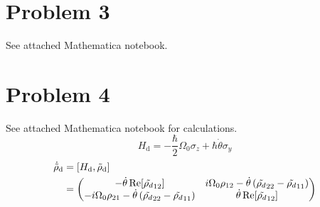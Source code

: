\documentclass[12pt]{article}
\begin{document}
\section*{Problem 3}
See attached Mathematica notebook.

\section*{Problem 4}
See attached Mathematica notebook for calculations.
\[ H_\text{d} = -\frac{\hbar}{2}\Omega_0\sigma_z + \hbar\dot{\theta}\sigma_y \]
\begin{align*}
    \dot{\tilde{\rho}}_\text{d} &= \comm{H_\text{d}}{\tilde{\rho}_\text{d}} \\
    &= \mqty(-\dot{\theta}\Re[\tilde{\rho_d}_{12}] & i\Omega_0\rho_{12}-\dot{\theta}\left(\tilde{\rho_d}_{22} - \tilde{\rho_d}_{11}\right) \\ -i\Omega_0\rho_{21}-\dot{\theta}\left(\tilde{\rho_d}_{22} - \tilde{\rho_d}_{11}\right) & \dot{\theta}\Re[\tilde{\rho_d}_{12}])
\end{align*}


\end{document}

